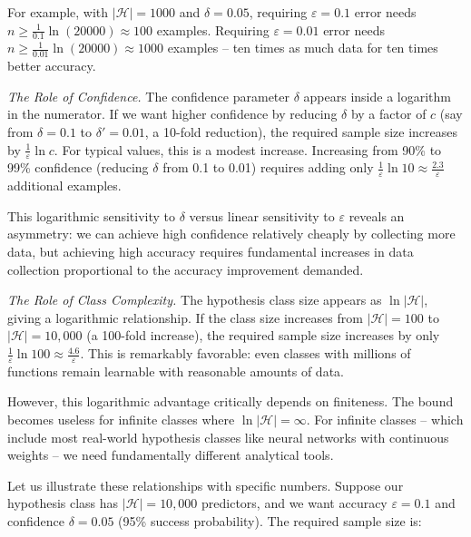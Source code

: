 For example, with $|\mathcal{H}| = 1000$ and $\delta = 0.05$, requiring $\varepsilon = 0.1$ error needs $n \ge \frac{1}{0.1}\ln(20000) \approx 100$ examples. Requiring $\varepsilon = 0.01$ error needs $n \ge \frac{1}{0.01}\ln(20000) \approx 1000$ examples -- ten times as much data for ten times better accuracy.

\emph{The Role of Confidence.} The confidence parameter $\delta$ appears inside a logarithm in the numerator. If we want higher confidence by reducing $\delta$ by a factor of $c$ (say from $\delta = 0.1$ to $\delta' = 0.01$, a 10-fold reduction), the required sample size increases by $\frac{1}{\varepsilon}\ln c$. For typical values, this is a modest increase. Increasing from 90\% to 99\% confidence (reducing $\delta$ from 0.1 to 0.01) requires adding only $\frac{1}{\varepsilon}\ln 10 \approx \frac{2.3}{\varepsilon}$ additional examples.

This logarithmic sensitivity to $\delta$ versus linear sensitivity to $\varepsilon$ reveals an asymmetry: we can achieve high confidence relatively cheaply by collecting more data, but achieving high accuracy requires fundamental increases in data collection proportional to the accuracy improvement demanded.

\emph{The Role of Class Complexity.} The hypothesis class size appears as $\ln|\mathcal{H}|$, giving a logarithmic relationship. If the class size increases from $|\mathcal{H}| = 100$ to $|\mathcal{H}| = 10,000$ (a 100-fold increase), the required sample size increases by only $\frac{1}{\varepsilon}\ln 100 \approx \frac{4.6}{\varepsilon}$. This is remarkably favorable: even classes with millions of functions remain learnable with reasonable amounts of data.

However, this logarithmic advantage critically depends on finiteness. The bound becomes useless for infinite classes where $\ln|\mathcal{H}| = \infty$. For infinite classes -- which include most real-world hypothesis classes like neural networks with continuous weights -- we need fundamentally different analytical tools.

\medskip
Let us illustrate these relationships with specific numbers. Suppose our hypothesis class has $|\mathcal{H}| = 10,000$ predictors, and we want accuracy $\varepsilon = 0.1$ and confidence $\delta = 0.05$ (95\% success probability). The required sample size is:

